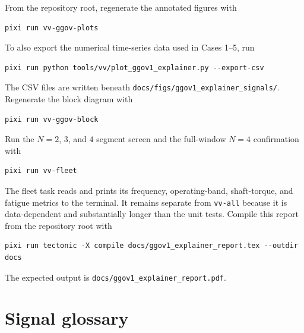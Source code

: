 \documentclass[11pt]{article}
\begin{document}
From the repository root, regenerate the annotated figures with
\begin{verbatim}
pixi run vv-ggov-plots
\end{verbatim}
To also export the numerical time-series data used in Cases 1--5, run
\begin{verbatim}
pixi run python tools/vv/plot_ggov1_explainer.py --export-csv
\end{verbatim}
The CSV files are written beneath
\texttt{docs/figs/ggov1\_explainer\_signals/}.  Regenerate the block diagram
with
\begin{verbatim}
pixi run vv-ggov-block
\end{verbatim}
Run the $N=2$, $3$, and $4$ segment screen and the full-window $N=4$
confirmation with
\begin{verbatim}
pixi run vv-fleet
\end{verbatim}
The fleet task reads  and prints its
frequency, operating-band, shaft-torque, and fatigue metrics to the terminal.
It remains separate from \texttt{vv-all} because it is data-dependent and
substantially longer than the unit tests.
Compile this report from the repository root with
\begin{verbatim}
pixi run tectonic -X compile docs/ggov1_explainer_report.tex --outdir docs
\end{verbatim}
The expected output is
\texttt{docs/ggov1\_explainer\_report.pdf}.

\appendix
\section{Signal glossary}
\end{document}
